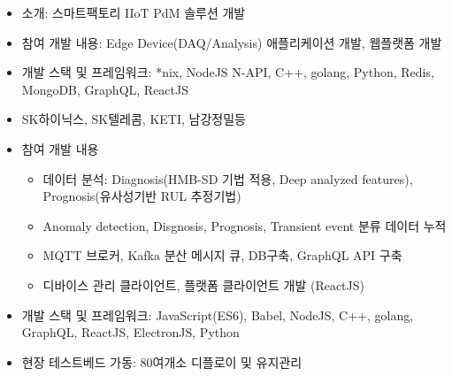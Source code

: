 
\begin{itemize}
	\item 소개: 스마트팩토리 IIoT PdM 솔루션 개발
	\item 참여 개발 내용: Edge Device(DAQ/Analysis) 애플리케이션 개발, 웹플랫폼 개발
	\item 개발 스택 및 프레임워크: *nix, NodeJS N-API, C++, golang, Python, Redis, MongoDB, GraphQL, ReactJS
	\item SK하이닉스, SK텔레콤, KETI, 남강정밀등
	\item 참여 개발 내용
	      \begin{itemize}
		      \item 데이터 분석: Diagnosis(HMB-SD 기법 적용, Deep analyzed features), Prognosis(유사성기반 RUL 추정기법)
		      \item Anomaly detection, Disgnosis, Prognosis, Transient event 분류 데이터 누적
		      \item MQTT 브로커, Kafka 분산 메시지 큐, DB구축, GraphQL API 구축
		      \item 디바이스 관리 클라이언트, 플랫폼 클라이언트 개발 (ReactJS)
	      \end{itemize}
	\item 개발 스택 및 프레임워크: JavaScript(ES6), Babel, NodeJS, C++, golang, GraphQL, ReactJS, ElectronJS, Python
	\item 현장 테스트베드 가동: 80여개소 디플로이 및 유지관리
\end{itemize}
